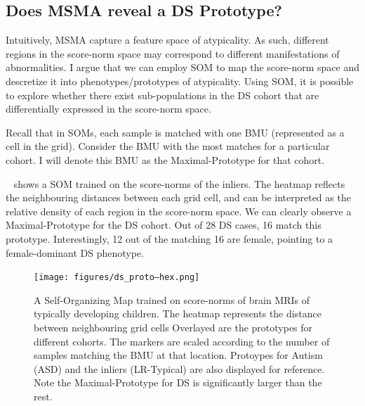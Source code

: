 \subsection*{Does MSMA reveal a DS Prototype?}


Intuitively, MSMA capture a feature space of atypicality. As such, different regions in the score-norm space may correspond to different manifestations of abnormalities. I argue that we can employ SOM to map the score-norm space and descretize it into phenotypes/prototypes of atypicality. Using SOM, it is possible to explore whether there exist sub-populations in the DS cohort that are differentially expressed in the score-norm space. 

Recall that in SOMs, each sample is matched with one BMU (represented as a cell in the grid). Consider the BMU with the most matches for a particular cohort. I will denote this BMU as the Maximal-Prototype for that cohort. 

~ shows a SOM trained on the score-norms of the inliers. The heatmap reflects the neighbouring distances between each grid cell, and can be interpreted as the relative density of each region in the score-norm space.  We can clearly observe a Maximal-Prototype for the DS cohort. Out of 28 DS cases, 16 match this prototype. Interestingly, 12 out of the matching 16 are female, pointing to a female-dominant DS phenotype.

\begin{figure}[tbhp]
\centering
\texttt{[image: figures/ds\_proto–hex.png]}
\caption{A Self-Organizing Map trained on score-norms of brain MRIs of typically developing children. The heatmap represents the distance between neighbouring grid cells
Overlayed are the prototypes for different cohorts.
The markers are scaled according to the number of samples matching the BMU at that location. Protoypes for Autism (ASD) and the inliers (LR-Typical) are also displayed for reference. Note the Maximal-Prototype for DS is significantly larger than the rest. 
}
\label{fig:som-abcd}
\end{figure}

